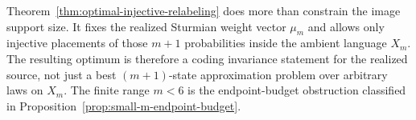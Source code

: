 \begin{remark}
\label{rem:injective-relabeling-stronger}
Theorem~\ref{thm:optimal-injective-relabeling} does more than constrain the
image support size. It fixes the realized Sturmian weight vector \(\mu_m\) and
allows only injective placements of those \(m+1\) probabilities inside the
ambient language \(X_m\). The resulting optimum is therefore a coding
invariance statement for the realized source, not just a best \((m+1)\)-state
approximation problem over arbitrary laws on \(X_m\).  The finite range
\(m<6\) is the endpoint-budget obstruction classified in
Proposition~\ref{prop:small-m-endpoint-budget}.
\end{remark}

